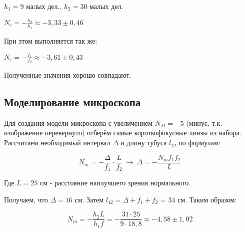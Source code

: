 \begin{center}
$h_1 = 9$ малых дел., \hspace{1cm} $h_2 = 30$ малых дел. \par
$N_{\tau} = -\frac{h_2}{h_1} \approx -3,33 \pm 0,46$
\end{center}

При этом выполняется так же:

\begin{center}
    $N_{\tau} = -\frac{f_1}{f_2} \approx -3,61 \pm 0,43$
\end{center}

Полученные значения хорошо совпадают.

\newpage
\subsection{Моделирование микроскопа}

Для создания модели микроскопа с увеличением $N_M = -5$ (минус, т.к. изображение перевернуто) отберём самые короткофокусные линзы из набора. 
Рассчитаем необходимый интервал $\Delta$ и длину тубуса  $l_12$ по формулам:

\[ N_m = -\frac{\Delta}{f_1} \cdot \frac{L}{f_2} \: \rightarrow \: \Delta = -\frac{N_m f_1 f_2}{L}  \]


Где $L = 25$ см - расстояние наилучшего зрения нормального. 


Получаем, что $\Delta = 16$ см. Затем $l_12 = \Delta + f_1 + f_2$ = 34 см.
Таким образом:

\[   N_m = -\frac{h_2 L}{h_1 f} = -\frac{31 \cdot 25}{9 \cdot 18,8} \approx -4,58  \pm 1,02  \]
